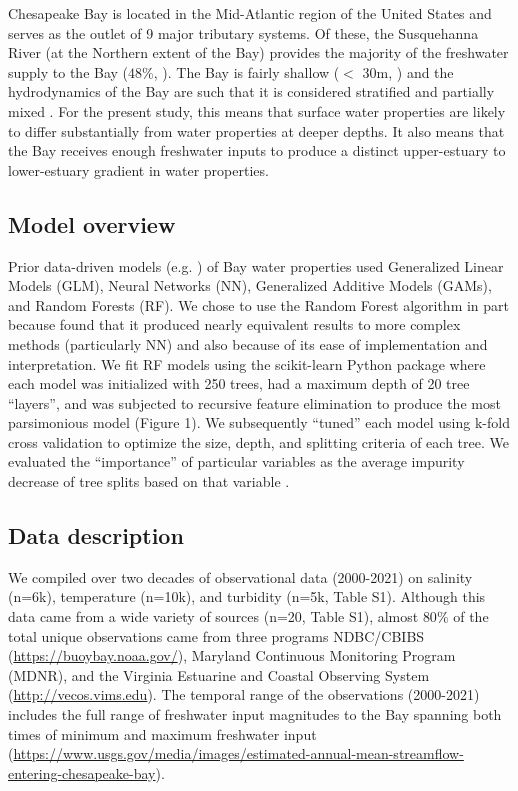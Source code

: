 \documentclass{article}
\begin{document}
Chesapeake Bay is located in the Mid-Atlantic region of the United States and serves as the outlet of 9 major tributary systems. Of these, the Susquehanna River (at the Northern extent of the Bay) provides the majority of the freshwater supply to the Bay (\texttildelow$48\%$, \cite{xuClimateForcingSalinity2012}). The Bay is fairly shallow ($<$ 30m, \cite{murphyComparisonSpatialInterpolation2010}) and the hydrodynamics of the Bay are such that it is considered stratified and partially mixed \cite{xuClimateForcingSalinity2012}. For the present study, this means that surface water properties are likely to differ substantially from water properties at deeper depths. It also means that the Bay receives enough freshwater inputs to produce a distinct upper-estuary to lower-estuary gradient in water properties.

\subsection{Model overview}

Prior data-driven models (e.g. \cite{urquhartGeospatialInterpolationMODISderived2013, vogelAssessingSatelliteSea2016}) of Bay water properties used Generalized Linear Models (GLM), Neural Networks (NN), Generalized Additive Models (GAMs), and Random Forests (RF). We chose to use the Random Forest algorithm in part because \cite{urquhartGeospatialInterpolationMODISderived2013} found that it produced nearly equivalent results to more complex methods (particularly NN) and also because of its ease of implementation and interpretation. We fit RF models using the scikit-learn Python package \cite{pedregosaScikitlearnMachineLearning2011} where each model was initialized with 250 trees, had a maximum depth of 20 tree “layers”, and was subjected to recursive feature elimination to produce the most parsimonious model (Figure 1). We subsequently “tuned” each model using k-fold cross validation to optimize the size, depth, and splitting criteria of each tree. We evaluated the “importance” of particular variables as the average impurity decrease of tree splits based on that variable \cite{pedregosaScikitlearnMachineLearning2011}.

\subsection{Data description}

\begin{sloppypar}
We compiled over two decades of observational data (2000-2021) on salinity (n=6k), temperature (n=10k), and turbidity (n=5k, Table S1). Although this data came from a wide variety of sources (n=20, Table S1), almost $80\%$ of the total unique observations came from three programs NDBC/CBIBS (\url{https://buoybay.noaa.gov/}), Maryland Continuous Monitoring Program (MDNR), and the Virginia Estuarine and Coastal Observing System (\url{http://vecos.vims.edu}). The temporal range of the observations (2000-2021) includes the full range of freshwater input magnitudes to the Bay spanning both times of minimum and maximum freshwater input (\url{https://www.usgs.gov/media/images/estimated-annual-mean-streamflow-entering-chesapeake-bay}).
\end{sloppypar}
\end{document}
